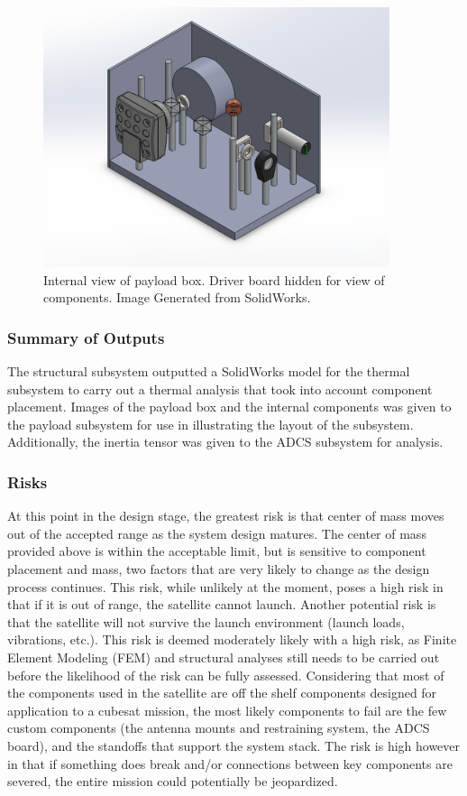 \documentclass[12pt]{article}
\begin{document}
\begin{figure}[!ht]
\centering
\includegraphics[width=4in]{images/STR-11.png}
\caption{Internal view of payload box. Driver board hidden for view of components. Image Generated from SolidWorks.}
\label{fig:str-11}
\end{figure}

\subsubsection{Summary of Outputs}
The structural subsystem outputted a SolidWorks model for the thermal subsystem to carry out a thermal analysis that took into account component placement.
Images of the payload box and the internal components was given to the payload subsystem for use in illustrating the layout of the subsystem.
Additionally, the inertia tensor was given to the ADCS subsystem for analysis.

\subsubsection{Risks}
At this point in the design stage, the greatest risk is that center of mass moves out of the accepted range as the system design matures. The center of mass provided above is within the acceptable limit, but is sensitive to component placement and mass, two factors that are very likely to change as the design process continues. This risk, while unlikely at the moment, poses a high risk in that if it is out of range, the satellite cannot launch.
Another potential risk is that the satellite will not survive the launch environment (launch loads, vibrations, etc.). This risk is deemed moderately likely with a high risk, as Finite Element Modeling (FEM) and structural analyses still needs to be carried out before the likelihood of the risk can be fully assessed. Considering that most of the components used in the satellite are off the shelf components designed for application to a cubesat mission, the most likely components to fail are the few custom components (the antenna mounts and restraining system, the ADCS board), and the standoffs that support the system stack. The risk is high however in that if something does break and/or connections between key components are severed, the entire mission could potentially be jeopardized.
\end{document}
